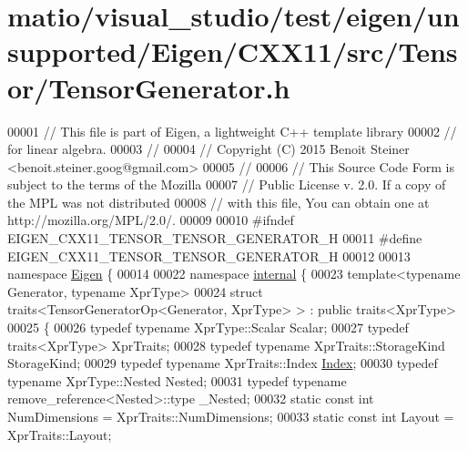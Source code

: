 \hypertarget{matio_2visual__studio_2test_2eigen_2unsupported_2_eigen_2_c_x_x11_2src_2_tensor_2_tensor_generator_8h_source}{}\section{matio/visual\+\_\+studio/test/eigen/unsupported/\+Eigen/\+C\+X\+X11/src/\+Tensor/\+Tensor\+Generator.h}
\label{matio_2visual__studio_2test_2eigen_2unsupported_2_eigen_2_c_x_x11_2src_2_tensor_2_tensor_generator_8h_source}

\begin{DoxyCode}
00001 \textcolor{comment}{// This file is part of Eigen, a lightweight C++ template library}
00002 \textcolor{comment}{// for linear algebra.}
00003 \textcolor{comment}{//}
00004 \textcolor{comment}{// Copyright (C) 2015 Benoit Steiner <benoit.steiner.goog@gmail.com>}
00005 \textcolor{comment}{//}
00006 \textcolor{comment}{// This Source Code Form is subject to the terms of the Mozilla}
00007 \textcolor{comment}{// Public License v. 2.0. If a copy of the MPL was not distributed}
00008 \textcolor{comment}{// with this file, You can obtain one at http://mozilla.org/MPL/2.0/.}
00009 
00010 \textcolor{preprocessor}{#ifndef EIGEN\_CXX11\_TENSOR\_TENSOR\_GENERATOR\_H}
00011 \textcolor{preprocessor}{#define EIGEN\_CXX11\_TENSOR\_TENSOR\_GENERATOR\_H}
00012 
00013 \textcolor{keyword}{namespace }\hyperlink{namespace_eigen}{Eigen} \{
00014 
00022 \textcolor{keyword}{namespace }\hyperlink{namespaceinternal}{internal} \{
00023 \textcolor{keyword}{template}<\textcolor{keyword}{typename} Generator, \textcolor{keyword}{typename} XprType>
00024 \textcolor{keyword}{struct }traits<TensorGeneratorOp<Generator, XprType> > : \textcolor{keyword}{public} traits<XprType>
00025 \{
00026   \textcolor{keyword}{typedef} \textcolor{keyword}{typename} XprType::Scalar Scalar;
00027   \textcolor{keyword}{typedef} traits<XprType> XprTraits;
00028   \textcolor{keyword}{typedef} \textcolor{keyword}{typename} XprTraits::StorageKind StorageKind;
00029   \textcolor{keyword}{typedef} \textcolor{keyword}{typename} XprTraits::Index \hyperlink{namespace_eigen_a62e77e0933482dafde8fe197d9a2cfde}{Index};
00030   \textcolor{keyword}{typedef} \textcolor{keyword}{typename} XprType::Nested Nested;
00031   \textcolor{keyword}{typedef} \textcolor{keyword}{typename} remove\_reference<Nested>::type \_Nested;
00032   \textcolor{keyword}{static} \textcolor{keyword}{const} \textcolor{keywordtype}{int} NumDimensions = XprTraits::NumDimensions;
00033   \textcolor{keyword}{static} \textcolor{keyword}{const} \textcolor{keywordtype}{int} Layout = XprTraits::Layout;

\end{DoxyCode}
